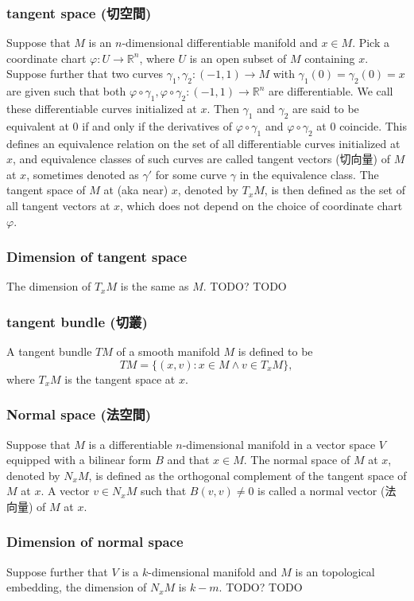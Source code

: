 \documentclass[a4paper,12pt]{report}
\begin{document}
\begin{itemize}
\begin{itemize}
\subsubsection{tangent space (切空間)}
Suppose that $M$ is an $n$-dimensional differentiable manifold and $x\in M$. Pick a coordinate chart $\varphi\colon U\to\mathbb{R}^n$, where $U$ is an open subset of $M$ containing $x$. Suppose further that two curves $\gamma_1,\gamma_2\colon (-1,1)\to M$ with $\gamma_1(0)=\gamma_2(0)=x$ are given such that both $\varphi\circ\gamma_1,\varphi\circ\gamma_2\colon (-1,1)\to\mathbb{R}^n$ are differentiable. We call these differentiable curves initialized at $x$. Then $\gamma_1$ and $\gamma_2$ are said to be equivalent at $0$ if and only if the derivatives of $\varphi\circ\gamma_1$ and $\varphi\circ\gamma_2$ at $0$ coincide. This defines an equivalence relation on the set of all differentiable curves initialized at $x$, and equivalence classes of such curves are called tangent vectors (切向量) of $M$ at $x$, sometimes denoted as $\gamma'$ for some curve $\gamma$ in the equivalence class. The tangent space of $M$ at (aka near) $x$, denoted by $T_xM$, is then defined as the set of all tangent vectors at $x$, which does not depend on the choice of coordinate chart $\varphi$.
\subsubsection{Dimension of tangent space}
The dimension of $T_xM$ is the same as $M$.
TODO?
\bpr
TODO 
\epr
\subsubsection{tangent bundle (切叢)}
A tangent bundle $TM$ of a smooth manifold $M$ is defined to be
\[TM=\{(x,v)\colon x\in M\land v\in T_xM\},\]
where $T_xM$ is the tangent space at $x$.
\subsubsection{Normal space (法空間)}
Suppose that $M$ is a differentiable $n$-dimensional manifold in a vector space $V$ equipped with a bilinear form $B$ and that $x\in M$. The normal space of $M$ at $x$, denoted by $N_xM$, is defined as the orthogonal complement of the tangent space of $M$ at $x$. A vector $v\in N_xM$ such that $B(v,v)\neq 0$ is called a normal vector (法向量) of $M$ at $x$.
\subsubsection{Dimension of normal space}
Suppose further that $V$ is a $k$-dimensional manifold and $M$ is an topological embedding, the dimension of $N_xM$ is $k-m$.
TODO?
\bpr
TODO 
\epr

\end{itemize}
\end{itemize}
\end{document}
